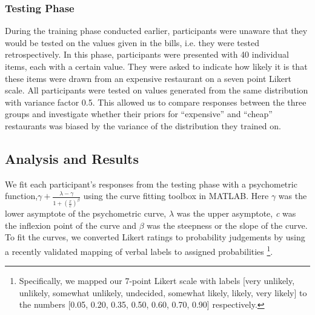 \documentclass[10pt,letterpaper]{article}
\begin{document}
\subsubsection{Testing Phase}
During the training phase conducted earlier, participants were unaware that they would be tested on the values given in the bills, i.e. they were tested retrospectively. In this phase, participants were presented with 40 individual items, each with a certain value. They were asked to indicate how likely it is that these items were drawn from an expensive restaurant on a seven point Likert scale. All participants were tested on values generated from the same distribution with variance factor 0.5. This allowed us to compare responses between the three groups and investigate whether their priors for “expensive” and “cheap” restaurants was biased by the variance of the distribution they trained on. 

\subsection{Analysis and Results}

We fit each participant's responses from the testing phase with  a psychometric function,$\gamma +\frac{\lambda - \gamma }{1 + (\frac{x}{c})^{\beta}}$ using the curve fitting toolbox in MATLAB. Here $\gamma$ was the lower asymptote of the psychometric curve, $\lambda$ was the upper asymptote, \textit{c} was the inflexion point of the curve and $\beta$ was the steepness or the slope of the curve. To fit the curves, we converted Likert ratings to probability judgements by using a recently validated mapping of verbal labels to assigned probabilities \cite{hancock2020quantifying}\footnote{Specifically, we mapped our 7-point Likert scale with labels [very unlikely, unlikely, somewhat unlikely, undecided, somewhat likely, likely, very likely] to the numbers [0.05, 0.20, 0.35, 0.50, 0.60, 0.70, 0.90] respectively.}.


\end{document}
